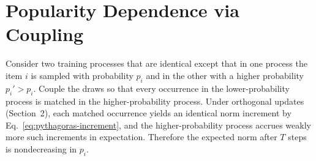 \section{Popularity Dependence via Coupling}
\label{app:popularity-dependence}

Consider two training processes that are identical except that in one process the item $i$ is sampled with probability $p_i$ and in the other with a higher probability $p_i' > p_i$. Couple the draws so that every occurrence in the lower-probability process is matched in the higher-probability process. Under orthogonal updates (Section~2), each matched occurrence yields an identical norm increment by Eq.~\eqref{eq:pythagoras-increment}, and the higher-probability process accrues weakly more such increments in expectation. Therefore the expected norm after $T$ steps is nondecreasing in $p_i$.


